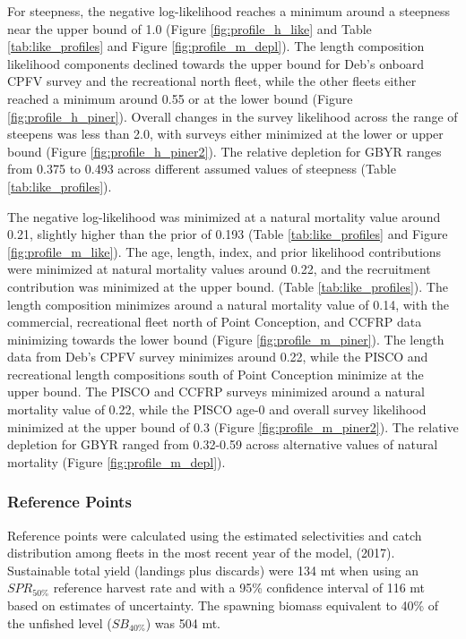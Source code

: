 \documentclass[12pt,]{article}
\begin{document}
For steepness, the negative log-likelihood reaches a minimum around a
steepness near the upper bound of 1.0 (Figure \ref{fig:profile_h_like}
and Table \ref{tab:like_profiles} and Figure \ref{fig:profile_m_depl}).
The length composition likelihood components declined towards the upper
bound for Deb's onboard CPFV survey and the recreational north fleet,
while the other fleets either reached a minimum around 0.55 or at the
lower bound (Figure \ref{fig:profile_h_piner}). Overall changes in the
survey likelihood across the range of steepens was less than 2.0, with
surveys either minimized at the lower or upper bound (Figure
\ref{fig:profile_h_piner2}). The relative depletion for GBYR ranges from
0.375 to 0.493 across different assumed values of steepness (Table
\ref{tab:like_profiles}).

The negative log-likelihood was minimized at a natural mortality value
around 0.21, slightly higher than the prior of 0.193 (Table
\ref{tab:like_profiles} and Figure \ref{fig:profile_m_like}). The age,
length, index, and prior likelihood contributions were minimized at
natural mortality values around 0.22, and the recruitment contribution
was minimized at the upper bound. (Table \ref{tab:like_profiles}). The
length composition minimizes around a natural mortality value of 0.14,
with the commercial, recreational fleet north of Point Conception, and
CCFRP data minimizing towards the lower bound (Figure
\ref{fig:profile_m_piner}). The length data from Deb's CPFV survey
minimizes around 0.22, while the PISCO and recreational length
compositions south of Point Conception minimize at the upper bound. The
PISCO and CCFRP surveys minimized around a natural mortality value of
0.22, while the PISCO age-0 and overall survey likelihood minimized at
the upper bound of 0.3 (Figure \ref{fig:profile_m_piner2}). The relative
depletion for GBYR ranged from 0.32-0.59 across alternative values of
natural mortality (Figure \ref{fig:profile_m_depl}).

\subsubsection{Reference Points}\label{reference-points-1}

Reference points were calculated using the estimated selectivities and
catch distribution among fleets in the most recent year of the model,
(2017). Sustainable total yield (landings plus discards) were 134 mt
when using an \(SPR_{50\%}\) reference harvest rate and with a 95\%
confidence interval of 116 mt based on estimates of uncertainty. The
spawning biomass equivalent to 40\% of the unfished level
(\(SB_{40\%}\)) was 504 mt.
\end{document}
